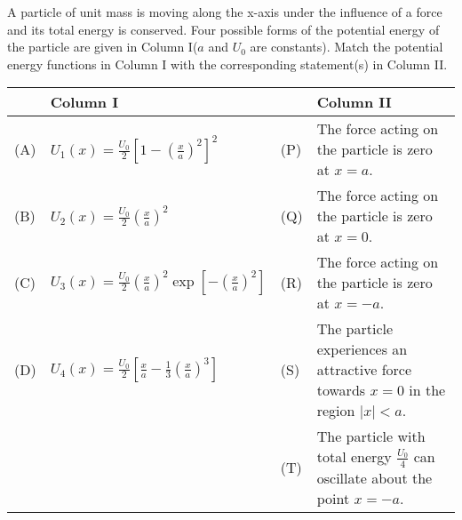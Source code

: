 \item A particle of unit mass is moving along the x-axis under the influence of a force and its total energy is conserved. Four possible forms of the potential energy of the particle are given in Column I($a$ and $U_0$ are constants). Match the potential energy functions in Column I with the corresponding statement(s) in Column II.
\begin{center}
    \renewcommand{\arraystretch}{3}
    \begin{table}[h]
        \centering
        \begin{tabular}{p{0.25cm}p{5cm}|p{0.25cm}p{8cm}}
        \hline
        & Column I & & Column II \\
        \hline
        (A) & \( U_1(x) = \frac{U_0}{2} \left[ 1 - \left( \frac{x}{a} \right)^2 \right]^2 \) & (P) & The force acting on the particle is zero at \( x = a \). \\
        (B) & \( U_2(x) = \frac{U_0}{2} \left( \frac{x}{a} \right)^2 \) & (Q) & The force acting on the particle is zero at \( x = 0 \). \\
        (C) & \( U_3(x) = \frac{U_0}{2} \left( \frac{x}{a} \right)^2 \exp \left[ - \left( \frac{x}{a} \right)^2 \right] \) & (R) & The force acting on the particle is zero at \( x = -a \). \\
        (D) & \( U_4(x) = \frac{U_0}{2} \left[ \frac{x}{a} - \frac{1}{3} \left( \frac{x}{a} \right)^3 \right] \) & (S) & The particle experiences an attractive force towards \( x = 0 \) in the region \( |x| < a \). \\
         &  & (T) & The particle with total energy \( \frac{U_0}{4} \) can oscillate about the point \( x = -a \). \\
        \hline
        \end{tabular}
    \end{table}
\end{center}
